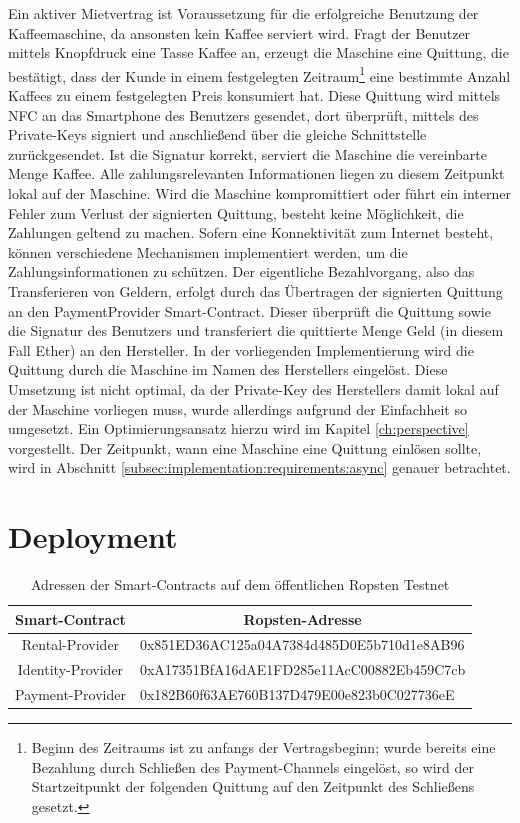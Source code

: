 Ein aktiver Mietvertrag ist Voraussetzung für die erfolgreiche Benutzung der Kaffeemaschine, da ansonsten kein Kaffee serviert wird. Fragt der Benutzer mittels Knopfdruck eine Tasse Kaffee an, erzeugt die Maschine eine Quittung, die bestätigt, dass der Kunde in einem festgelegten Zeitraum\footnote{Beginn des Zeitraums ist zu anfangs der Vertragsbeginn; wurde bereits eine Bezahlung durch Schließen des Payment-Channels eingelöst, so wird der Startzeitpunkt der folgenden Quittung auf den Zeitpunkt des Schließens gesetzt.} eine bestimmte Anzahl Kaffees zu einem festgelegten Preis konsumiert hat. Diese Quittung wird mittels \ac{NFC} an das Smartphone des Benutzers gesendet, dort überprüft, mittels des Private-Keys signiert und anschließend über die gleiche Schnittstelle zurückgesendet. Ist die Signatur korrekt, serviert die Maschine die vereinbarte Menge Kaffee. Alle zahlungsrelevanten Informationen liegen zu diesem Zeitpunkt lokal auf der Maschine. Wird die Maschine kompromittiert oder führt ein interner Fehler zum Verlust der signierten Quittung, besteht keine Möglichkeit, die Zahlungen geltend zu machen. Sofern eine Konnektivität zum Internet besteht, können verschiedene Mechanismen implementiert werden, um die Zahlungsinformationen zu schützen. Der eigentliche Bezahlvorgang, also das Transferieren von Geldern, erfolgt durch das Übertragen der signierten Quittung an den PaymentProvider Smart-Contract. Dieser überprüft die Quittung sowie die Signatur des Benutzers und transferiert die quittierte Menge Geld (in diesem Fall Ether) an den Hersteller. In der vorliegenden Implementierung wird die Quittung durch die Maschine im Namen des Herstellers eingelöst. Diese Umsetzung ist nicht optimal, da der Private-Key des Herstellers damit lokal auf der Maschine vorliegen muss, wurde allerdings aufgrund der Einfachheit so umgesetzt. Ein Optimierungsansatz hierzu wird im Kapitel \ref{ch:perspective} vorgestellt. Der Zeitpunkt, wann eine Maschine eine Quittung einlösen sollte, wird in Abschnitt \ref{subsec:implementation:requirements:async} genauer betrachtet.

\newpage

\section{Deployment}
\label{sec:appendix:implementation:deployment}
\begin{table}[h]
\begin{tabular}{@{}cl@{}}
\toprule
\textbf{Smart-Contract} & \multicolumn{1}{c}{\textbf{Ropsten-Adresse}} \\ \midrule
Rental-Provider & 0x851ED36AC125a04A7384d485D0E5b710d1e8AB96 \\
Identity-Provider & 0xA17351BfA16dAE1FD285e11AcC00882Eb459C7cb \\
Payment-Provider & 0x182B60f63AE760B137D479E00e823b0C027736eE \\ \bottomrule
\end{tabular}
\caption{Adressen der Smart-Contracts auf dem öffentlichen Ropsten Testnet}
\label{tab:ropsten}
\end{table}

